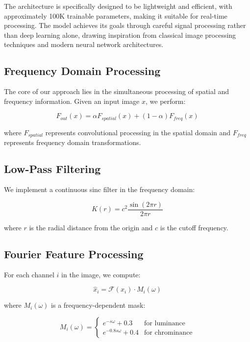 \documentclass{article}
\begin{document}
The architecture is specifically designed to be lightweight and efficient, with approximately 100K trainable parameters, making it suitable for real-time processing. The model achieves its goals through careful signal processing rather than deep learning alone, drawing inspiration from classical image processing techniques and modern neural network architectures.

\subsection{Frequency Domain Processing}
The core of our approach lies in the simultaneous processing of spatial and frequency information. Given an input image $x$, we perform:

\begin{equation}
F_{out}(x) = \alpha F_{spatial}(x) + (1-\alpha)F_{freq}(x)
\end{equation}

where $F_{spatial}$ represents convolutional processing in the spatial domain and $F_{freq}$ represents frequency domain transformations.

\subsection{Low-Pass Filtering}
We implement a continuous sinc filter in the frequency domain:

\begin{equation}
K(r) = c^2 \frac{\sin(2\pi r)}{2\pi r}
\end{equation}

where $r$ is the radial distance from the origin and $c$ is the cutoff frequency.

\subsection{Fourier Feature Processing}
For each channel $i$ in the image, we compute:

\begin{equation}
\hat{x}_i = \mathcal{F}(x_i) \cdot M_i(\omega)
\end{equation}

where $M_i(\omega)$ is a frequency-dependent mask:

\begin{equation}
M_i(\omega) = \begin{cases}
e^{-s\omega} + 0.3 & \text{for luminance} \\
e^{-0.8s\omega} + 0.4 & \text{for chrominance}
\end{cases}
\end{equation}
\end{document}
